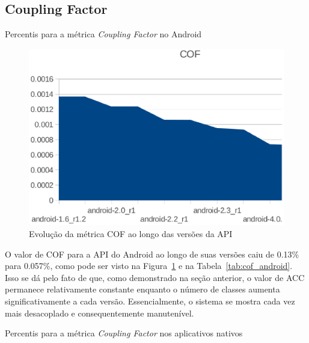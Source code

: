 \subsection{Coupling Factor}

\begin{table}[!htb]
\centering
{}

\caption{Percentis para a métrica \textit{Coupling Factor} no Android}
\label{tab:cof_android}
\end{table}

\begin{figure}[!htb]
\centering
\includegraphics [keepaspectratio=true,scale=0.7]{figuras/graphs/cof_android.eps}
\caption{Evolução da métrica COF ao longo das versões da API}
\label{fig:cof_android}
\end{figure}


O valor de COF para a API do Android ao longo de suas versões caiu de 0.13\% para 0.057\%, como pode ser visto na Figura~\ref{fig:cof_android} e na Tabela~\ref{tab:cof_android}. Isso se dá pelo fato de que, como demonstrado na seção anterior, o valor de ACC permanece relativamente constante enquanto o número de classes aumenta significativamente a cada versão. Essencialmente, o sistema se mostra cada vez mais desacoplado e consequentemente manutenível. 

\begin{table}[!htb]
\centering
{}

\caption{Percentis para a métrica \textit{Coupling Factor} nos aplicativos nativos}
\label{tab:cof_apps}
\end{table}


